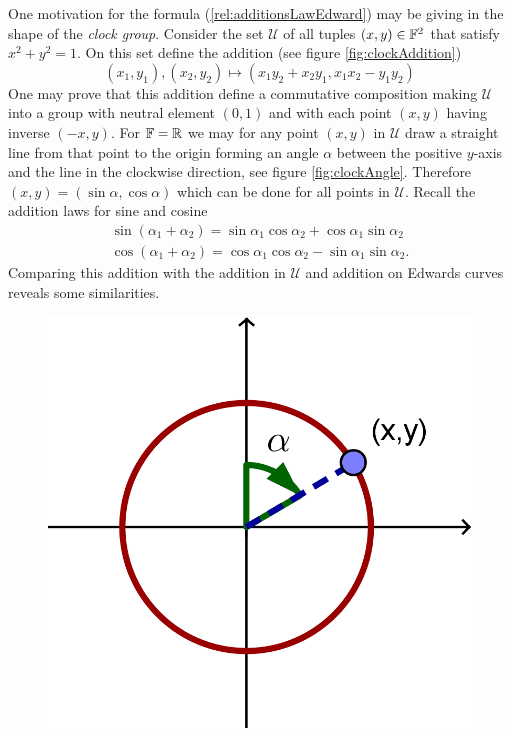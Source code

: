 \begin{ex}\label{ex:clockGroup}
One motivation for the formula (\ref{rel:additionsLawEdward}) may be giving in the shape of the \textit{clock group}. Consider the set $\mathcal{U}$ of all tuples $(x,y)\in \mathbb{F}^2$ that satisfy $x^2+y^2=1$. On this set define the addition (see figure \ref{fig:clockAddition})
\[
	(x_1,y_1),(x_2,y_2)\mapsto (x_1y_2+x_2y_1,x_1x_2-y_1y_2)
\]
One may prove that this addition define a commutative composition making $\mathcal{U}$ into a group with neutral element $(0,1)$ and with each point $(x,y)$ having inverse $(-x,y)$. For $\mathbb{F}=\mathbb{R}$ we may for any point $(x,y)$ in $\mathcal{U}$ draw a straight line from that point to the origin forming an angle $\alpha$ between the positive $y$-axis and the line in the clockwise direction, see figure \ref{fig:clockAngle}. Therefore $(x,y)=(\sin\alpha,\cos\alpha)$ which can be done for all points in $\mathcal{U}$. Recall the addition laws for sine and cosine
\begin{align*}	\sin(\alpha_1+\alpha_2)=\sin\alpha_1\cos\alpha_2+\cos\alpha_1\sin\alpha_2\\	\cos(\alpha_1+\alpha_2)=\cos\alpha_1\cos\alpha_2-\sin\alpha_1\sin\alpha_2.
\end{align*}
Comparing this addition with the addition in $\mathcal{U}$ and addition on Edwards curves reveals some similarities.  
\begin{figure}[htp]
\begin{minipage}[b]{0.5\linewidth}
\centering
\includegraphics[scale=1]{clock_angle.png}

\end{minipage}
\end{figure}
\end{ex}
